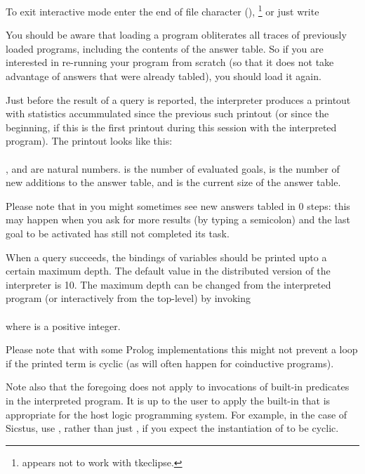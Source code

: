 To exit interactive mode enter the end of file character
(),%
\footnote{
   appears not to work with tkeclipse.}
or just write\\
\ind{}

You should be aware that loading a program obliterates all traces of
previously loaded programs, including the contents of the answer table.  So
if you are interested in re-running your program from scratch (so that it
does not take advantage of answers that were already tabled), you should load
it again.

Just before the result of a query is reported, the interpreter produces a
printout with statistics accummulated since the previous such printout (or
since the beginning, if this is the first printout during this session with
the interpreted program). The printout looks like
this:\\ \ind{}\\ ,
 and  are natural numbers.  is the number of
evaluated goals,  is the number of new additions to the answer table,
and  is the current size of the answer table.

Please note that in you might sometimes see new answers tabled in 0 steps:
this may happen when you ask for more results (by typing a semicolon) and the
last goal to be activated has still not completed its task.

When a query succeeds, the bindings of variables should be printed upto a
certain maximum depth.  The default value in the distributed version of the
interpreter is 10.  The maximum depth can be changed from the interpreted
program (or interactively from the top-level) by invoking\\
\ind{}\\
where  is a positive integer.

Please note that with some Prolog implementations this might not prevent a
loop if the printed term is cyclic (as will often happen for coinductive
programs).

Note also that the foregoing does not apply to invocations of built-in
predicates in the interpreted program.  It is up to the user to apply the
built-in that is appropriate for the host logic programming system.  For
example, in the case of Sicstus, use
, rather than just , if you expect the instantiation of  to be cyclic.



